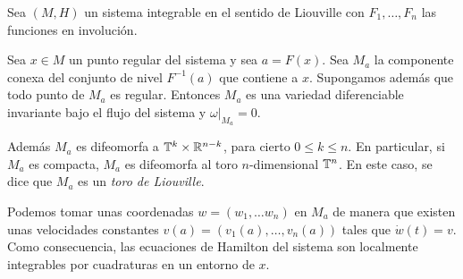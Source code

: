 \begin{thm}\label{arnold}
Sea $(M,H)$ un sistema integrable en el sentido de Liouville con $F_1,\dots,F_n$ las funciones en involución.

   Sea $x\in M$ un punto regular del sistema y sea $a=F(x)$. Sea $M_a$ la componente conexa del conjunto de nivel $F^{-1}(a)$ que contiene a $x$. Supongamos además que todo punto de $M_a$ es regular. Entonces $M_a$ es una variedad diferenciable invariante bajo el flujo del sistema y $\left. \omega \right|_{M_a}=0$.
  
 Además $M_a$ es difeomorfa a $\mathbb{T}^k\times \mathbb{R}^{n-k}$, para cierto $0 \leq k \leq n$. En particular, si $M_a$ es compacta, $M_a$ es difeomorfa al toro $n$-dimensional $\mathbb{T}^n$. En este caso, se dice que $M_a$ es un \emph{toro de Liouville}. 
 
 Podemos tomar unas coordenadas $w=(w_1,\dots w_n)$ en $M_a$ de manera que existen unas velocidades constantes $v(a)=(v_1(a),\dots,v_n(a))$ tales que $\dot w (t)=v$. Como consecuencia, las ecuaciones de Hamilton del sistema son localmente integrables por cuadraturas en un entorno de $x$.

\end{thm}

